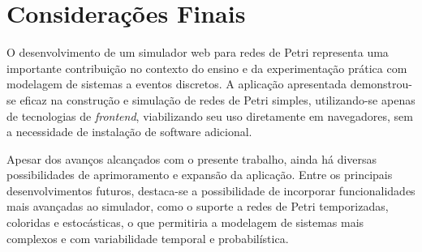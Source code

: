 \documentclass[
	12pt,				%
	openright,			%
	oneside,			%
	a4paper,			%
	english,			%
	brazil				%
	]{abntex2}
\theoremstyle{doispontos}
\begin{document}








\chapter{Considerações Finais} \label{cap:resultados}

O desenvolvimento de um simulador web para redes de Petri representa uma importante contribuição no contexto do ensino e da experimentação prática com modelagem de sistemas a eventos discretos. A aplicação apresentada demonstrou-se eficaz na construção e simulação de redes de Petri simples, utilizando-se apenas de tecnologias de \textit{frontend}, viabilizando seu uso diretamente em navegadores, sem a necessidade de instalação de software adicional.

Apesar dos avanços alcançados com o presente trabalho, ainda há diversas possibilidades de aprimoramento e expansão da aplicação. Entre os principais desenvolvimentos futuros, destaca-se a possibilidade de incorporar funcionalidades mais avançadas ao simulador, como o suporte a redes de Petri temporizadas, coloridas e estocásticas, o que permitiria a modelagem de sistemas mais complexos e com variabilidade temporal e probabilística.
\end{document}
